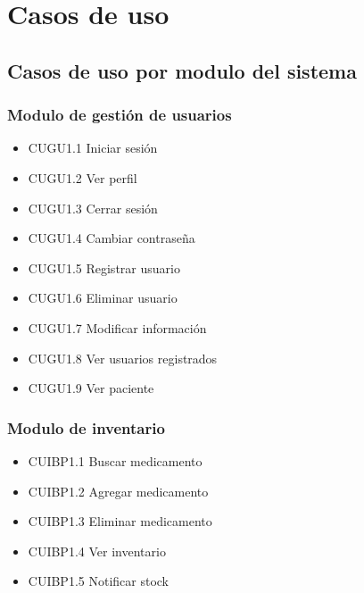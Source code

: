 \documentclass[12pt,letterpaper]{article}
\begin{document}
    \section{Casos de uso}
        \justify
            \subsection{Casos de uso por modulo del sistema}
                \subsubsection{Modulo de gestión de usuarios}
                    \begin{itemize}
                        \item CUGU1.1 Iniciar sesión 
                        \item CUGU1.2 Ver perfil
                        \item CUGU1.3 Cerrar sesión 
                        \item CUGU1.4 Cambiar contraseña 
                        \item CUGU1.5 Registrar usuario 
                        \item CUGU1.6 Eliminar usuario 
                        \item CUGU1.7 Modificar información 
                        \item CUGU1.8 Ver usuarios registrados 
                        \item CUGU1.9 Ver paciente 
                    \end{itemize}
                \subsubsection{Modulo de inventario}
                    \begin{itemize}
                        \item CUIBP1.1 Buscar medicamento 
                        \item CUIBP1.2 Agregar medicamento 
                        \item CUIBP1.3 Eliminar medicamento 
                        \item CUIBP1.4 Ver inventario 
                        \item CUIBP1.5 Notificar stock 
                    \end{itemize}
\end{document}
